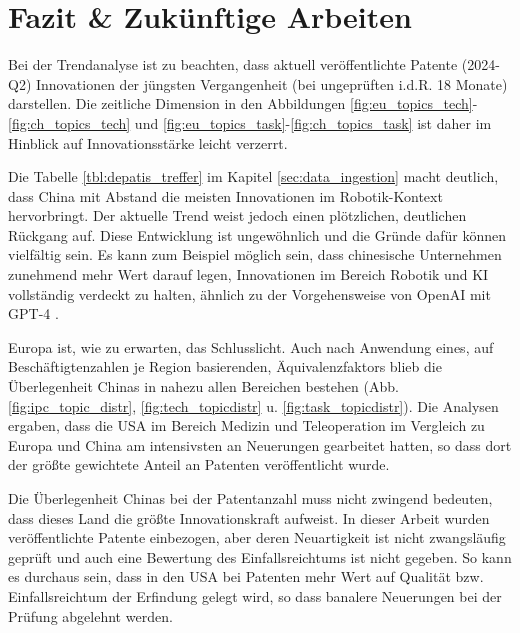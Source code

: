 \newpage
\section{Fazit \& Zukünftige Arbeiten}
Bei der Trendanalyse ist zu beachten, dass aktuell veröffentlichte Patente (2024-Q2) Innovationen der jüngsten Vergangenheit (bei ungeprüften i.d.R. 18 Monate) darstellen. Die zeitliche Dimension in den Abbildungen \ref{fig:eu_topics_tech}-\ref{fig:ch_topics_tech} und \ref{fig:eu_topics_task}-\ref{fig:ch_topics_task} ist daher im Hinblick auf Innovationsstärke leicht verzerrt.

Die Tabelle \ref{tbl:depatis_treffer} im Kapitel \ref{sec:data_ingestion} macht deutlich, dass China mit Abstand die meisten Innovationen im Robotik-Kontext hervorbringt. Der aktuelle Trend weist jedoch einen plötzlichen, deutlichen Rückgang auf. Diese Entwicklung ist ungewöhnlich und die Gründe dafür können vielfältig sein. Es kann zum Beispiel möglich sein, dass chinesische Unternehmen zunehmend mehr Wert darauf legen, Innovationen im Bereich Robotik und KI vollständig verdeckt zu halten, ähnlich zu der Vorgehensweise von OpenAI mit GPT-4 \autocite{vincent2023openai}.

Europa ist, wie zu erwarten, das Schlusslicht. Auch nach Anwendung eines, auf Beschäftigtenzahlen je Region basierenden, Äquivalenzfaktors blieb die Überlegenheit Chinas in nahezu allen Bereichen bestehen (Abb. \ref{fig:ipc_topic_distr}, \ref{fig:tech_topicdistr} u. \ref{fig:task_topicdistr}). 
Die Analysen ergaben, dass die USA im Bereich Medizin und Teleoperation im Vergleich zu Europa und China am intensivsten an Neuerungen gearbeitet hatten, so dass dort der größte gewichtete Anteil an Patenten veröffentlicht wurde.

Die Überlegenheit Chinas bei der Patentanzahl muss nicht zwingend bedeuten, dass dieses Land die größte Innovationskraft aufweist. In dieser Arbeit wurden veröffentlichte Patente einbezogen, aber deren Neuartigkeit ist nicht zwangsläufig geprüft und auch eine Bewertung des Einfallsreichtums ist nicht gegeben. So kann es durchaus sein, dass in den USA bei Patenten mehr Wert auf Qualität bzw. Einfallsreichtum der Erfindung gelegt wird, so dass banalere Neuerungen bei der Prüfung abgelehnt werden.